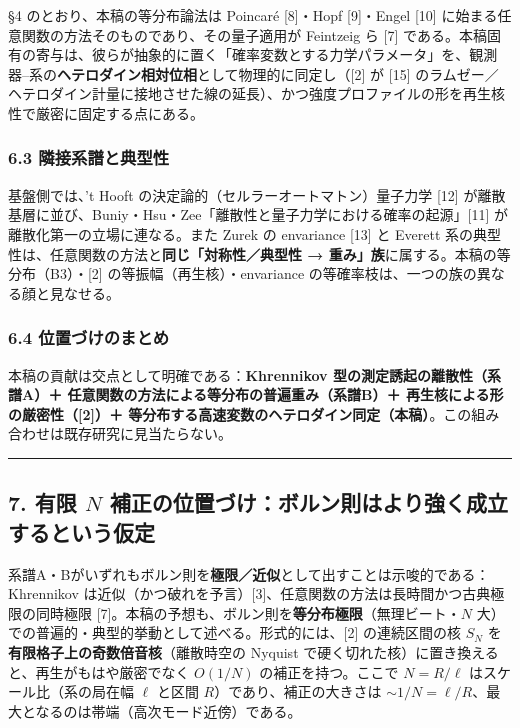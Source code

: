\documentclass[
]{ltjsarticle}
\begin{document}
§4 のとおり、本稿の等分布論法は Poincaré {[}8{]}・Hopf {[}9{]}・Engel
{[}10{]} に始まる任意関数の方法そのものであり、その量子適用が Feintzeig
ら {[}7{]}
である。本稿固有の寄与は、彼らが抽象的に置く「確率変数とする力学パラメータ」を、観測器--系の\textbf{ヘテロダイン相対位相}として物理的に同定し（{[}2{]}
が {[}15{]}
のラムゼー／ヘテロダイン計量に接地させた線の延長）、かつ強度プロファイルの形を再生核性で厳密に固定する点にある。

\subsubsection{6.3
隣接系譜と典型性}\label{ux96a3ux63a5ux7cfbux8b5cux3068ux5178ux578bux6027}

基盤側では、't Hooft の決定論的（セルラーオートマトン）量子力学 {[}12{]}
が離散基層に並び、Buniy・Hsu・Zee「離散性と量子力学における確率の起源」{[}11{]}
が離散化第一の立場に連なる。また Zurek の envariance {[}13{]} と Everett
系の典型性は、任意関数の方法と\textbf{同じ「対称性／典型性 →
重み」族}に属する。本稿の等分布（B3）・{[}2{]}
の等振幅（再生核）・envariance
の等確率枝は、一つの族の異なる顔と見なせる。

\subsubsection{6.4
位置づけのまとめ}\label{ux4f4dux7f6eux3065ux3051ux306eux307eux3068ux3081}

本稿の貢献は交点として明確である：\textbf{Khrennikov
型の測定誘起の離散性（系譜A）＋
任意関数の方法による等分布の普遍重み（系譜B）＋
再生核による形の厳密性（{[}2{]}）＋
等分布する高速変数のヘテロダイン同定（本稿）}。この組み合わせは既存研究に見当たらない。

\begin{center}\rule{0.5\linewidth}{0.5pt}\end{center}

\subsection{\texorpdfstring{7. 有限 \(N\)
補正の位置づけ：ボルン則はより強く成立するという仮定}{7. 有限 N 補正の位置づけ：ボルン則はより強く成立するという仮定}}\label{ux6709ux9650-n-ux88dcux6b63ux306eux4f4dux7f6eux3065ux3051ux30dcux30ebux30f3ux5247ux306fux3088ux308aux5f37ux304fux6210ux7acbux3059ux308bux3068ux3044ux3046ux4eeeux5b9a}

系譜A・Bがいずれもボルン則を\textbf{極限／近似}として出すことは示唆的である：Khrennikov
は近似（かつ破れを予言）{[}3{]}、任意関数の方法は長時間かつ古典極限の同時極限
{[}7{]}。本稿の予想も、ボルン則を\textbf{等分布極限}（無理ビート・\(N\)
大）での普遍的・典型的挙動として述べる。形式的には、{[}2{]}
の連続区間の核 \(S_N\) を\textbf{有限格子上の奇数倍音核}（離散時空の
Nyquist で硬く切れた核）に置き換えると、再生がもはや厳密でなく
\(O(1/N)\) の補正を持つ。ここで \(N=R/\ell\) はスケール比（系の局在幅
\(\ell\) と区間 \(R\)）であり、補正の大きさは
\(\sim1/N=\ell/R\)、最大となるのは帯端（高次モード近傍）である。
\end{document}
